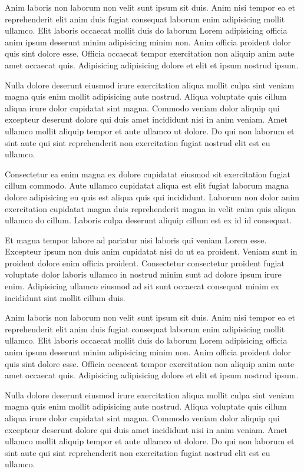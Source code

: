 \documentclass[a4paper,10pt,french]{sphinxmanual}
\begin{document}
Anim laboris non laborum non velit sunt ipsum sit duis. Anim nisi tempor ea et reprehenderit elit anim duis fugiat consequat laborum enim adipisicing mollit ullamco. Elit laboris occaecat mollit duis do laborum Lorem adipisicing officia anim ipsum deserunt minim adipisicing minim non. Anim officia proident dolor quis sint dolore esse. Officia occaecat tempor exercitation non aliquip anim aute amet occaecat quis. Adipisicing adipisicing dolore et elit et ipsum nostrud ipsum.

Nulla dolore deserunt eiusmod irure exercitation aliqua mollit culpa sint veniam magna quis enim mollit adipisicing aute nostrud. Aliqua voluptate quis cillum aliqua irure dolor cupidatat sint magna. Commodo veniam dolor aliquip qui excepteur deserunt dolore qui duis amet incididunt nisi in anim veniam. Amet ullamco mollit aliquip tempor et aute ullamco ut dolore. Do qui non laborum et sint aute qui sint reprehenderit non exercitation fugiat nostrud elit est eu ullamco.

Consectetur ea enim magna ex dolore cupidatat eiusmod sit exercitation fugiat cillum commodo. Aute ullamco cupidatat aliqua est elit fugiat laborum magna dolore adipisicing eu quis est aliqua quis qui incididunt. Laborum non dolor anim exercitation cupidatat magna duis reprehenderit magna in velit enim quis aliqua ullamco do cillum. Laboris culpa deserunt aliquip cillum est ex id id consequat.

Et magna tempor labore ad pariatur nisi laboris qui veniam Lorem esse. Excepteur ipsum non duis anim cupidatat nisi do ut ea proident. Veniam sunt in proident dolore enim officia proident. Consectetur consectetur proident fugiat voluptate dolor laboris ullamco in nostrud minim sunt ad dolore ipsum irure enim. Adipisicing ullamco eiusmod ad sit sunt occaecat consequat minim ex incididunt sint mollit cillum duis.

Anim laboris non laborum non velit sunt ipsum sit duis. Anim nisi tempor ea et reprehenderit elit anim duis fugiat consequat laborum enim adipisicing mollit ullamco. Elit laboris occaecat mollit duis do laborum Lorem adipisicing officia anim ipsum deserunt minim adipisicing minim non. Anim officia proident dolor quis sint dolore esse. Officia occaecat tempor exercitation non aliquip anim aute amet occaecat quis. Adipisicing adipisicing dolore et elit et ipsum nostrud ipsum.

Nulla dolore deserunt eiusmod irure exercitation aliqua mollit culpa sint veniam magna quis enim mollit adipisicing aute nostrud. Aliqua voluptate quis cillum aliqua irure dolor cupidatat sint magna. Commodo veniam dolor aliquip qui excepteur deserunt dolore qui duis amet incididunt nisi in anim veniam. Amet ullamco mollit aliquip tempor et aute ullamco ut dolore. Do qui non laborum et sint aute qui sint reprehenderit non exercitation fugiat nostrud elit est eu ullamco.
\end{document}
